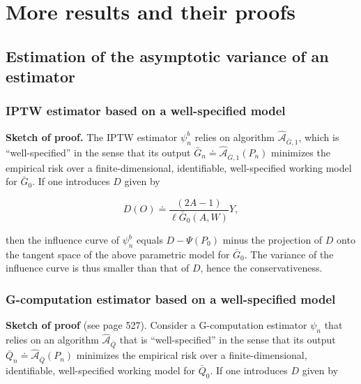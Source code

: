 \documentclass[11pt,openright,twoside]{book}
\newcommand{\Algo}{\widehat{\mathcal{A}}}
\newcommand{\defq}{\doteq}
\newcommand{\Gbar}{\bar{G}}
\newcommand{\Qbar}{\bar{Q}}
\theoremstyle{definition}
\theoremstyle{definition}
\theoremstyle{definition}
\theoremstyle{remark}
\begin{document}
\hypertarget{more-proofs}{%
\chapter{More results and their proofs}\label{more-proofs}}

\hypertarget{estimation-of-the-asymptotic-variance-of-an-estimator}{%
\section{Estimation of the asymptotic variance of an estimator}\label{estimation-of-the-asymptotic-variance-of-an-estimator}}

\hypertarget{iptw-est-var}{%
\subsection{IPTW estimator based on a well-specified model}\label{iptw-est-var}}

\textbf{Sketch of proof.} The IPTW estimator \(\psi_{n}^{b}\) relies on algorithm
\(\Algo_{\Gbar,1}\), which is ``well-specified'' in the
sense that its output \(\Gbar_{n}\defq \Algo_{\Gbar,1}(P_{n})\) minimizes the
empirical risk over a finite-dimensional, identifiable, well-specified working
model for \(\Gbar_{0}\). If one introduces \(D\) given by

\begin{equation*}
D(O) \defq \frac{(2A-1)}{\ell\Gbar_{0}(A,W)} Y,
\end{equation*}

then the influence curve of \(\psi_{n}^{b}\) equals \(D - \Psi(P_{0})\) minus the
projection of \(D\) onto the tangent space of the above parametric model for
\(\Gbar_{0}\). The variance of the influence curve is thus smaller than that of
\(D\), hence the conservativeness.

\hypertarget{gcomp-est-var}{%
\subsection{G-computation estimator based on a well-specified model}\label{gcomp-est-var}}

\textbf{Sketch of proof} (see \citep{TMLEbook11} page 527). Consider a G-computation
estimator \(\psi_{n}\) that relies on an algorithm \(\Algo_{\Qbar}\) that is
``well-specified'' in the sense that its output
\(\Qbar_{n}\defq \Algo_{\Qbar}(P_{n})\) minimizes the empirical risk over a
finite-dimensional, identifiable, well-specified working model for
\(\Qbar_{0}\). If one introduces \(D\) given by
\end{document}

